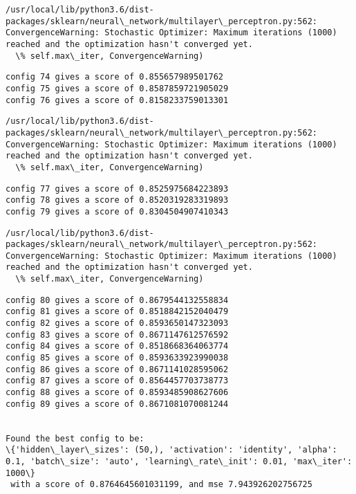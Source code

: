 \documentclass[11pt]{article}
\begin{document}
    \begin{Verbatim}[commandchars=\\\{\}]
/usr/local/lib/python3.6/dist-packages/sklearn/neural\_network/multilayer\_perceptron.py:562: ConvergenceWarning: Stochastic Optimizer: Maximum iterations (1000) reached and the optimization hasn't converged yet.
  \% self.max\_iter, ConvergenceWarning)

    \end{Verbatim}

    \begin{Verbatim}[commandchars=\\\{\}]
config 74 gives a score of 0.855657989501762
config 75 gives a score of 0.8587859721905029
config 76 gives a score of 0.8158233759013301

    \end{Verbatim}

    \begin{Verbatim}[commandchars=\\\{\}]
/usr/local/lib/python3.6/dist-packages/sklearn/neural\_network/multilayer\_perceptron.py:562: ConvergenceWarning: Stochastic Optimizer: Maximum iterations (1000) reached and the optimization hasn't converged yet.
  \% self.max\_iter, ConvergenceWarning)

    \end{Verbatim}

    \begin{Verbatim}[commandchars=\\\{\}]
config 77 gives a score of 0.8525975684223893
config 78 gives a score of 0.8520319283319893
config 79 gives a score of 0.8304504907410343

    \end{Verbatim}

    \begin{Verbatim}[commandchars=\\\{\}]
/usr/local/lib/python3.6/dist-packages/sklearn/neural\_network/multilayer\_perceptron.py:562: ConvergenceWarning: Stochastic Optimizer: Maximum iterations (1000) reached and the optimization hasn't converged yet.
  \% self.max\_iter, ConvergenceWarning)

    \end{Verbatim}

    \begin{Verbatim}[commandchars=\\\{\}]
config 80 gives a score of 0.8679544132558834
config 81 gives a score of 0.8518842152040479
config 82 gives a score of 0.8593650147323093
config 83 gives a score of 0.8671147612576592
config 84 gives a score of 0.8518668364063774
config 85 gives a score of 0.8593633923990038
config 86 gives a score of 0.8671141028595062
config 87 gives a score of 0.8564457703738773
config 88 gives a score of 0.8593485908627606
config 89 gives a score of 0.8671081070081244


Found the best config to be:
\{'hidden\_layer\_sizes': (50,), 'activation': 'identity', 'alpha': 0.1, 'batch\_size': 'auto', 'learning\_rate\_init': 0.01, 'max\_iter': 1000\}
 with a score of 0.8764645601031199, and mse 7.943926202756725

    \end{Verbatim}
\end{document}
